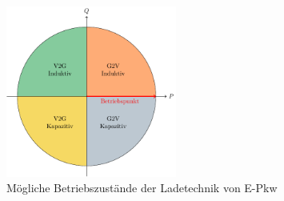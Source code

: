 \begin{figure}[H]
    \centering
    \includegraphics[width=0.5\textwidth]{Bilder/four-quadrant_operation}
    \caption[Mögliche Betriebszustände der Ladetechnik von E-Pkw]{Mögliche Betriebszustände der Ladetechnik von E-Pkw \cite{He2020}}\label{fig:four-quadrant}
\end{figure}